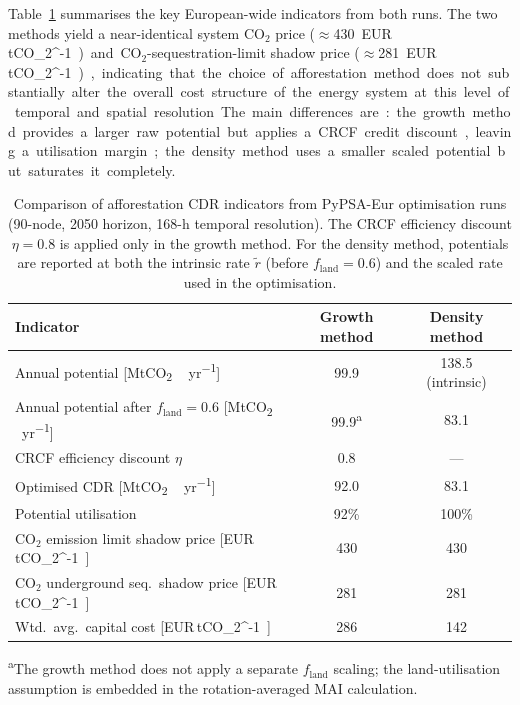 \documentclass[12pt, a4paper]{article}
\begin{document}
Table~\ref{tab:affo_pypsa_summary} summarises the key European-wide indicators from both runs. The two methods yield a near-identical system CO$_2$ price ($\approx$430~\si{EUR\,tCO_2^{-1}}) and CO$_2$-sequestration-limit shadow price ($\approx$281~\si{EUR\,tCO_2^{-1}}), indicating that the choice of afforestation method does not substantially alter the overall cost structure of the energy system at this level of temporal and spatial resolution. The main differences are: the growth method provides a larger raw potential but applies a CRCF credit discount, leaving a utilisation margin; the density method uses a smaller scaled potential but saturates it completely.

\begin{table}[htbp]
\centering
\caption{Comparison of afforestation CDR indicators from PyPSA-Eur optimisation runs
(90-node, 2050 horizon, 168-h temporal resolution).
The CRCF efficiency discount $\eta = 0.8$ is applied only in the growth method.
For the density method, potentials are reported at both the intrinsic rate $\tilde{r}$
(before $f_{\text{land}} = 0.6$) and the scaled rate used in the optimisation.}
\label{tab:affo_pypsa_summary}
\begin{tabular}{@{}p{7.5cm}cc@{}}
\toprule
\textbf{Indicator} & \textbf{Growth method} & \textbf{Density method} \\
\midrule
Annual potential [\si{MtCO_2\,yr^{-1}}]                              & 99.9  & 138.5 (intrinsic) \\
Annual potential after $f_{\text{land}}=0.6$ [\si{MtCO_2\,yr^{-1}}] & 99.9\textsuperscript{a} & 83.1 \\
CRCF efficiency discount $\eta$                                       & 0.8   & --- \\
Optimised CDR [\si{MtCO_2\,yr^{-1}}]                                 & 92.0  & 83.1 \\
Potential utilisation                                                 & 92\%  & 100\% \\
CO$_2$ emission limit shadow price [\si{EUR\,tCO_2^{-1}}]             & 430   & 430 \\
CO$_2$ underground seq.\ shadow price [\si{EUR\,tCO_2^{-1}}]         & 281   & 281 \\
Wtd.\ avg.\ capital cost [\si{EUR\,tCO_2^{-1}}]                      & 286   & 142 \\
\bottomrule
\end{tabular}
\par\vspace{4pt}
{\footnotesize \textsuperscript{a}The growth method does not apply a
separate $f_{\text{land}}$ scaling; the land-utilisation assumption
is embedded in the rotation-averaged MAI calculation.}
\end{table}
\end{document}
